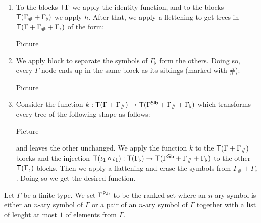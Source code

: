\begin{example}
\begin{enumerate}
\item To the blocks $\mathsf T \Gamma$ we apply the identity function, and to the blocks $\mathsf T(\Gamma_\#+\Gamma_\flat)$ we apply $h$. After that, we apply a flettening to get trees in $\mathsf T(\Gamma+\Gamma_\#+\Gamma_\flat)$ of the form:
\begin{center}
Picture
\end{center} 
\item We apply block to separate the symbols of $\Gamma_\flat$ form the others. Doing so, every $\Gamma$ node ends up in the same block as its siblings (marked with $\#$):
\begin{center}
Picture
\end{center}
\item Consider the function $k:\mathsf T(\Gamma+\Gamma_\#)\to \mathsf T(\Gamma^{\sf{Sib}}+\Gamma_\#+\Gamma_\flat)$ which transforms every tree of the following shape as follows:
\begin{center}
Picture
\end{center}
and leaves the other unchanged. We apply the function $k$ to the $\mathsf T(\Gamma+\Gamma_\#)$
blocks and the injection $\mathsf T (\iota_1\circ \iota_1):\mathsf T(\Gamma_\flat)\to \mathsf T(\Gamma^{\sf{Sib}}+\Gamma_\#+\Gamma_\flat)$ to the other $\mathsf T(\Gamma_\flat)$ blocks. Then we apply a flattening and erase the symbols from $\Gamma_\#+\Gamma_\flat$. Doing so we get the desired function.
\end{enumerate}
\medskip

Let $\Gamma$ be a finite type. We set $\Gamma^{\sf{Par}}$ to be the ranked set where an $n$-ary symbol is either an $n$-ary symbol of $\Gamma$ or a pair of an $n$-ary symbol of $\Gamma$ together with a list of lenght at most $1$ of elements from $\Gamma$. %


\end{example}
